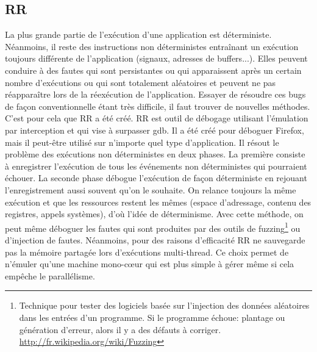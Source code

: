 \subsection{RR}
\label{subsection:RR}

La plus grande partie de l'exécution d'une application est
déterministe. Néanmoins, il reste des instructions non déterministes entraînant
un exécution toujours différente de l'application (signaux, adresses de
buffers...). Elles peuvent conduire à des fautes qui sont persistantes ou qui
apparaissent après un certain nombre d'exécutions ou qui sont totalement
aléatoires et peuvent ne pas réapparaître lors de la réexécution de
l'application. Essayer de résoudre ces bugs de façon conventionnelle étant très
difficile, il faut trouver de nouvelles méthodes. C'est pour cela que RR a été
créé. RR \citep{RR} est outil de débogage utilisant l'émulation par interception
et qui vise à surpasser gdb. Il a été créé pour déboguer Firefox, mais il
peut-être utilisé sur n'importe quel type d'application. Il résout le problème
des exécutions non déterministes en deux phases. La première consiste à
enregistrer l'exécution de tous les événements non déterministes qui pourraient
échouer. La seconde phase débogue l'exécution de façon déterministe en rejouant
l'enregistrement aussi souvent qu'on le souhaite. On relance toujours la même
exécution et que les ressources restent les mêmes (espace d'adressage, contenu
des registres, appels systèmes), d'où l'idée de déterminisme. Avec cette
méthode, on peut même déboguer les fautes qui sont produites par des outils de
fuzzing\footnote{ Technique pour tester des logiciels basée sur l'injection des
  données aléatoires dans les entrées d'un programme. Si le programme échoue:
  plantage ou génération d'erreur, alors il y a des défauts à
  corriger. \\ \url{http://fr.wikipedia.org/wiki/Fuzzing}} ou d'injection de
fautes. Néanmoins, pour des raisons d'efficacité RR ne sauvegarde pas la mémoire
partagée lors d'exécutions multi-thread. Ce choix permet de n'émuler qu'une
machine mono-c\oe ur qui est plus simple à gérer même si cela empêche le
parallélisme.

